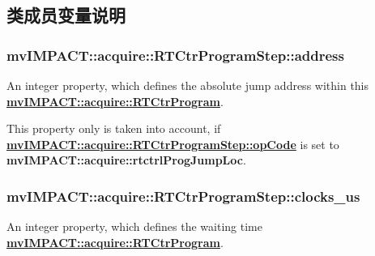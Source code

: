 \subsection{类成员变量说明}
\hypertarget{classmv_i_m_p_a_c_t_1_1acquire_1_1_r_t_ctr_program_step_a2a9740df9ac629e37f87b67249858f4c}{
\subsubsection[{address}]{ mv\+I\+M\+P\+A\+C\+T\+::acquire\+::\+R\+T\+Ctr\+Program\+Step\+::address}}\label{classmv_i_m_p_a_c_t_1_1acquire_1_1_r_t_ctr_program_step_a2a9740df9ac629e37f87b67249858f4c}


An integer property, which defines the absolute jump address within this {\bfseries \hyperlink{classmv_i_m_p_a_c_t_1_1acquire_1_1_r_t_ctr_program}{mv\+I\+M\+P\+A\+C\+T\+::acquire\+::\+R\+T\+Ctr\+Program}}. 

This property only is taken into account, if {\bfseries \hyperlink{classmv_i_m_p_a_c_t_1_1acquire_1_1_r_t_ctr_program_step_a823c9cad26ad628155d68130ad1d6d5d}{mv\+I\+M\+P\+A\+C\+T\+::acquire\+::\+R\+T\+Ctr\+Program\+Step\+::op\+Code}} is set to {\bfseries mv\+I\+M\+P\+A\+C\+T\+::acquire\+::rtctrl\+Prog\+Jump\+Loc}. \hypertarget{classmv_i_m_p_a_c_t_1_1acquire_1_1_r_t_ctr_program_step_a3939901a39a4b5b95d3c1b1c5f176458}{
\subsubsection[{clocks\+\_\+us}]{ mv\+I\+M\+P\+A\+C\+T\+::acquire\+::\+R\+T\+Ctr\+Program\+Step\+::clocks\+\_\+us}}\label{classmv_i_m_p_a_c_t_1_1acquire_1_1_r_t_ctr_program_step_a3939901a39a4b5b95d3c1b1c5f176458}


An integer property, which defines the waiting time {\bfseries \hyperlink{classmv_i_m_p_a_c_t_1_1acquire_1_1_r_t_ctr_program}{mv\+I\+M\+P\+A\+C\+T\+::acquire\+::\+R\+T\+Ctr\+Program}}. 

